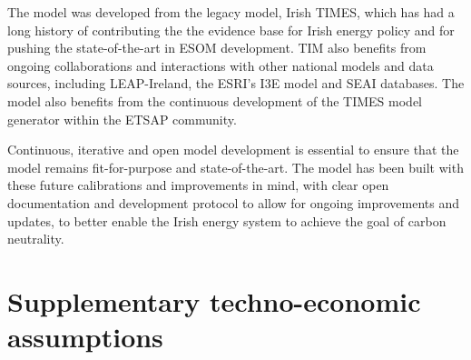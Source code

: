 \documentclass[journal abbreviation, manuscript]{copernicus}
\begin{document}
The model was developed from the legacy model, Irish TIMES, which has had a long history of contributing the the evidence base for Irish energy policy and for pushing the state-of-the-art in ESOM development. TIM also benefits from ongoing collaborations and interactions with other national models and data sources, including LEAP-Ireland, the ESRI's I3E model and SEAI databases. The model also benefits from the continuous development of the TIMES model generator within the ETSAP community.

Continuous, iterative and open model development is essential to ensure that the model remains fit-for-purpose and state-of-the-art. The model has been built with these future calibrations and improvements in mind, with clear open documentation and development protocol to allow for ongoing improvements and updates, to better enable the Irish energy system to achieve the goal of carbon neutrality. 













\clearpage


\appendix 
\section{Supplementary techno-economic assumptions}
\label{s:Appendix-data}
\end{document}
